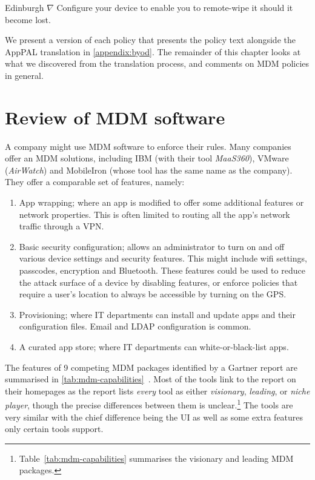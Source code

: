 \documentclass[thesis.tex]{subfiles}
\begin{document}
\begin{policyrule}{Edinburgh}
  $\nabla$ Configure your device to enable you to remote-wipe it should it become lost.
\end{policyrule}

We present a version of each policy that presents the policy text
alongside the AppPAL translation in \autoref{appendix:byod}.  The
remainder of this chapter looks at what we discovered from the
translation process, and comments on \ac{MDM} policies in general.

\section{Review of \ac{MDM} software}

A company might use \ac{MDM} software to enforce their rules.  Many
companies offer an \ac{MDM} solutions, including IBM (with their tool
\emph{MaaS360}), VMware (\emph{AirWatch}) and MobileIron (whose tool
has the same name as the company). They offer a comparable set of
features, namely:
\begin{enumerate}
\item App wrapping; where an app is modified to offer some additional
  features or network properties. This is often limited to routing all
  the app's network traffic through a VPN.
\item Basic security configuration; allows an administrator to turn on
  and off various device settings and security features. This might
  include wifi settings, passcodes, encryption and Bluetooth.  These
  features could be used to reduce the attack surface of a device by
  disabling features, or enforce policies that require a user's location
  to always be accessible by turning on the GPS.
\item Provisioning; where IT departments can install and update apps and
  their configuration files. Email and LDAP configuration is common.
\item A curated app store; where IT departments can white-or-black-list apps.
\end{enumerate}

The features of 9 competing \ac{MDM} packages identified by a Gartner
report are summarised in
\autoref{tab:mdm-capabilities}~\cite{rob_smith_magic_2016}.  Most of
the tools link to the report on their homepages as the report lists
\emph{every} tool as either \emph{visionary}, \emph{leading}, or
\emph{niche player}, though the precise differences between them is unclear.\footnote{Table~\ref{tab:mdm-capabilities}
  summarises the visionary and leading \ac{MDM} packages.}  The tools are very similar with the chief difference being the UI
as well as some extra features only certain tools support.
\end{document}
